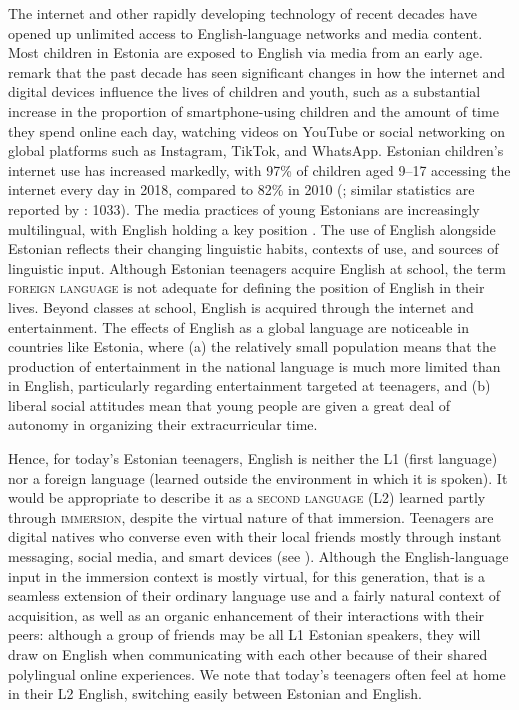 \documentclass[output=paper]{langscibook}
\begin{document}
The internet and other rapidly developing technology of recent decades have opened up unlimited access to English-language networks and media content. Most children in Estonia are exposed to English via media from an early age. \citet[1027]{KalmusEtAl2022} remark that the past decade has seen significant changes in how the internet and digital devices influence the lives of children and youth, such as a substantial increase in the proportion of smartphone-using children and the amount of time they spend online each day, watching videos on YouTube or social networking on global platforms such as Instagram, TikTok, and WhatsApp. Estonian children’s internet use has increased markedly, with 97\% of children aged 9--17 accessing the internet every day in 2018, compared to 82\% in 2010 (\citealt{SukkSoo2019}; similar statistics are reported by \citealt{KalmusEtAl2022}: 1033). The media practices of young Estonians are increasingly multilingual, with English holding a key position \citep{PraakliEtAl2022}. The use of English alongside Estonian reflects their changing linguistic habits, contexts of use, and sources of linguistic input. Although Estonian teenagers acquire English at school, the term \textsc{foreign} \textsc{language} is not adequate for defining the position of English in their lives. Beyond classes at school, English is acquired through the internet and entertainment. The effects of English as a global language are noticeable in countries like Estonia, where (a) the relatively small population means that the production of entertainment in the national language is much more limited than in English, particularly regarding entertainment targeted at teenagers, and (b) liberal social attitudes mean that young people are given a great deal of autonomy in organizing their extracurricular time.

Hence, for today’s Estonian teenagers, English is neither the L1 (first language) nor a foreign language (learned outside the environment in which it is spoken). It would be appropriate to describe it as a \textsc{second} \textsc{language} (L2) learned partly through \textsc{immersion}, despite the virtual nature of that immersion. Teenagers are digital natives who converse even with their local friends mostly through instant messaging, social media, and smart devices (see \citealt{Paus-HasebrinkEtAl2019}). Although the English-language input in the immersion context is mostly virtual, for this generation, that is a seamless extension of their ordinary language use and a fairly natural context of acquisition, as well as an organic enhancement of their interactions with their peers: although a group of friends may be all L1 Estonian speakers, they will draw on English when communicating with each other because of their shared polylingual online experiences. We note that today’s teenagers often feel at home in their L2 English, switching easily between Estonian and English.
\end{document}
